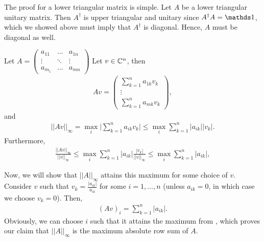The proof for a lower triangular matrix is simple. 
Let $A$ be a lower triangular unitary matrix.
Then $A^{\dagger}$ is upper triangular and unitary since $A^{\dagger} A = \id$, which we showed above must imply that $A^{\dagger}$ is diagonal.
Hence, $A$ must be diagonal as well.



Let $A = \begin{pmatrix}
    a_{11} & \ldots & a_{1n} \\
    \vdots & \ddots & \vdots \\
    a_{m_1} & \ldots & a_{mn}
\end{pmatrix}
$
Let $v \in \mathbb{C}^{n}$, then
\begin{eqnarray}
    \label{eq:Av}
    Av = \begin{pmatrix}
    \sum_{k=1}^{n} a_{1k}v_{k} \\
        \vdots \\
        \sum_{k=1}^{n} a_{mk}v_{k}
    \end{pmatrix}
,\end{eqnarray}
and
\begin{eqnarray}
    \label{eq:infty-norm-Av}
    || Av ||_{\infty} = \max_{i} \Bigg|\sum_{k=1}^{n} a_{ik}v_{k}\Bigg| \leq \max_{i} \sum_{k=1}^{n} |a_{ik}||v_{k}|
.\end{eqnarray}
Furthermore,
\begin{eqnarray}
    \label{eq:infty-norm-Av-div-norm-v}
    \frac{||Av||_{\infty}}{||v||_{\infty}} \leq \max_{i} \sum_{k=1}^{n} |a_{ik}|\frac{|v_{k}|}{||v||_{\infty}} \leq \max_{i} \sum_{k=1}^{n} |a_{ik}|
,\end{eqnarray}

Now, we will show that $||A||_{\infty}$ attains this maximum for some choice of $v$.
Consider $v$ such that $\displaystyle v_{k} = \frac{|a_{ik}|}{a_{ik}}$ for some $i = 1,\ldots,n$ (unless $a_{ik} = 0$, in which case we choose $v_{k} = 0$).
Then, 
\begin{eqnarray}
    \label{eq:Av-particular-v}
    (Av)_{i} = \sum_{k=1}^{n} |a_{ik}|
.\end{eqnarray}
Obviously, we can choose $i$ such that it attains the maximum from , which proves our claim that $||A||_{\infty}$ is the maximum absolute row sum of $A$.



